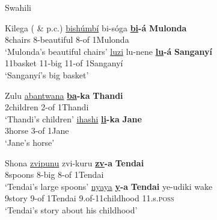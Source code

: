 \documentclass[output=paper
,modfonts
,nonflat]{langsci/langscibook}
\begin{document}
\begin{exe}
		\ex Swahili \citep[100]{Carstens1991} \label{ex-carstens:8}
{\multicolsep=0pt\begin{multicols}{2}
		\xlist
		\endxlist
\end{multicols}}
\end{exe}
\begin{exe}
	\ex Kilega (\citealt{Kinyalolo1991} \& p.c.)\label{ex-carstens:9}
	\xlist
	\ex 
	\gll \uline{bishúmbí}   bi-sóga        \textbf{\uline{bi}-á}   \textbf{Mulonda} \\
	8chairs       8-beautiful     8-of    1Mulonda\\
	\glt `Mulonda’s beautiful chairs'  	
	\ex 
	\gll \uline{luzi}               lu-nene   \textbf{\uline{lu}-á}    \textbf{Sanganyí}\\
	11basket   11-big    11-of      1Sanganyí\\
	\glt `Sanganyí’s big basket'
	\endxlist
\end{exe}
\begin{exe}
	\ex Zulu \label{ex-carstens:10}
	\xlist
	\ex 
	\gll \uline{abantwana} \textbf{\uline{ba}{}-ka}   \textbf{Thandi} \\
	2children     2-of        1Thandi\\
	\glt `Thandi’s children'  	
	\ex 
	\gll \uline{ihashi}   \textbf{\uline{li}{}-ka}  \textbf{Jane}\\
	3horse 3-of     1Jane\\
	\glt `Jane’s horse'
	\endxlist
\end{exe}
\begin{exe}
	\ex Shona \label{ex-carstens:11}
	\xlist
	\ex 
	\gll \uline{zvipunu}   zvi-kuru \textbf{\uline{zv}{}-a}     \textbf{Tendai} \\
	8spoons   8-big       8-of    1Tendai\\
	\glt `Tendai’s large spoons'  	
	\ex 
	\gll \uline{nyaya}   \textbf{\uline{y}{}-a}     \textbf{Tendai}   ye-udiki             wake\\
	9story   9-of    1Tendai   9.of-11childhood     11.s.\textsc{poss}\\
	\glt `Tendai's story about his childhood'
	\endxlist
\end{exe}
\end{document}
